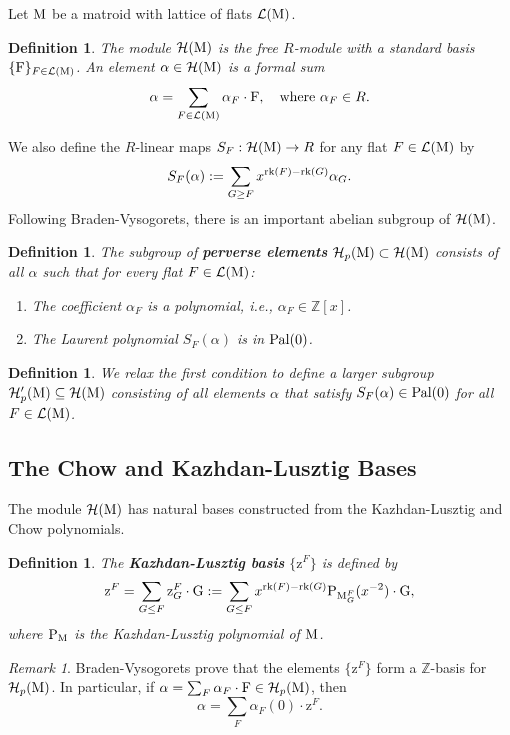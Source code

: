\documentclass[11pt]{article}
\newcommand{\calH}{\mathcal{H}}
\newcommand{\klpoly}{\normalfont\text{P}}
\newcommand{\rank}{\normalfont\text{rk}}
\newcommand{\M}{\normalfont\text{M}}
\newcommand{\ZZ}{\mathbb{Z}}
\newcommand{\Ebasis}[1]{\mathrm{#1}}
\newcommand{\klbasis}[1]{\mathrm{z}^{#1}}
\newcommand{\klbasisSub}[2]{\mathrm{z}^{#1}_{#2}}
\newcommand{\pal}{\normalfont\text{Pal}}
\newtheorem{definition}[theorem]{Definition}
\theoremstyle{remark}
\newtheorem*{remark}{Remark} %
\begin{document}
Let \(\M\) be a matroid with lattice of flats \(\mathcal{L}(\M)\).
\begin{definition}
    The module \(\calH(\M)\) is the free \(R\)-module with a standard basis \(\{\Ebasis{F}\}_{F \in \mathcal{L}(\M)}\). An element \(\alpha \in \calH(\M)\) is a formal sum
    \[ \alpha = \sum_{F \in \mathcal{L}(\M)} \alpha_F \cdot\Ebasis{F}, \quad \text{where } \alpha_F \in R. \]
\end{definition}

We also define the \(R\)-linear maps \(S_F: \calH(\M) \to R\) for any flat \(F \in \mathcal{L}(\M)\) by
\[ S_F(\alpha) := \sum_{G \ge F} x^{\rank(F)-\rank(G)} \alpha_G. \]
Following Braden-Vysogorets, there is an important abelian subgroup of \(\calH(\M)\).
\begin{definition}
    The subgroup of \textbf{perverse elements} \(\calH_p(\M) \subset \calH(\M)\) consists of all \(\alpha\) such that for every flat \(F \in \mathcal{L}(\M)\):
    \begin{enumerate}
        \item The coefficient \(\alpha_F\) is a polynomial, i.e., \(\alpha_F \in \ZZ[x]\).
        \item The Laurent polynomial \(S_F(\alpha)\) is in \(\pal(0)\).
    \end{enumerate}
\end{definition}
\begin{definition}
    We relax the first condition to define a larger subgroup \(\calH'_p(\M) \subseteq \calH(\M)\)
    consisting of all elements \(\alpha\) that satisfy \(S_F(\alpha) \in \pal(0)\)
    for all \(F \in \mathcal{L}(\M)\).
\end{definition}

\subsection{The Chow and Kazhdan-Lusztig Bases}
The module \(\calH(\M)\) has natural bases constructed from the Kazhdan-Lusztig and Chow polynomials.

\begin{definition}
    The \textbf{Kazhdan-Lusztig basis} \(\{\klbasis{F}\}\) is defined by
    \[ \klbasis{F} = \sum_{G \le F} \klbasisSub{F}{G}\cdot\Ebasis{G} := \sum_{G \le F} x^{\rank(F)-\rank(G)} \klpoly_{\M_G^F}(x^{-2}) \cdot \Ebasis{G}, \]
    where \(\klpoly_{\M}\) is the Kazhdan-Lusztig polynomial of \(\M\).
\end{definition}

\begin{remark}
    Braden-Vysogorets prove that the elements \(\{\klbasis{F}\}\) form a \(\ZZ\)-basis for \(\calH_p(\M)\). In
    particular, if \(\alpha = \sum_F \alpha_F \cdot \Ebasis{F} \in \calH_p(\M)\), then
    \[ \alpha = \sum_F \alpha_F(0) \cdot \klbasis{F}. \]
\end{remark}
\end{document}
